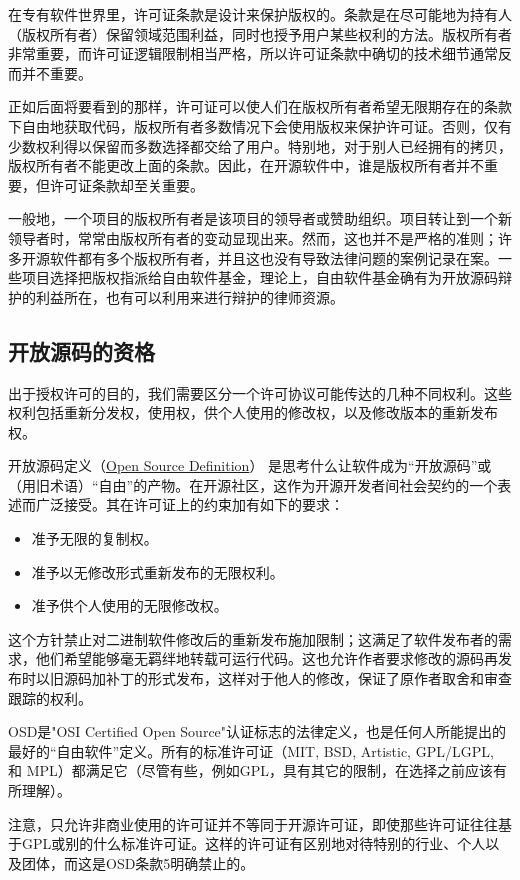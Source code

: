 \documentclass[12pt,oneside]{book}
\begin{document}
在专有软件世界里，许可证条款是设计来保护版权的。条款是在尽可能地为持有人（版权所有者）保留领域范围利益，同时也授予用户某些权利的方法。版权所有者非常重要，而许可证逻辑限制相当严格，所以许可证条款中确切的技术细节通常反而并不重要。

正如后面将要看到的那样，许可证可以使人们在版权所有者希望无限期存在的条款下自由地获取代码，版权所有者多数情况下会使用版权来保护许可证。否则，仅有少数权利得以保留而多数选择都交给了用户。特别地，对于别人已经拥有的拷贝，版权所有者不能更改上面的条款。因此，在开源软件中，谁是版权所有者并不重要，但许可证条款却至关重要。

一般地，一个项目的版权所有者是该项目的领导者或赞助组织。项目转让到一个新领导者时，常常由版权所有者的变动显现出来。然而，这也并不是严格的准则；许多开源软件都有多个版权所有者，并且这也没有导致法律问题的案例记录在案。一些项目选择把版权指派给自由软件基金，理论上，自由软件基金确有为开放源码辩护的利益所在，也有可以利用来进行辩护的律师资源。

\subsection{开放源码的资格}
出于授权许可的目的，我们需要区分一个许可协议可能传达的几种不同权利。这些权利包括重新分发权，使用权，供个人使用的修改权，以及修改版本的重新发布权。

开放源码定义（\href{http://www.opensource.org/osd.html}{Open Source Definition}） 是思考什么让软件成为“开放源码”或（用旧术语）“自由”的产物。在开源社区，这作为开源开发者间社会契约的一个表述而广泛接受。其在许可证上的约束加有如下的要求：
\begin{itemize}
\item 准予无限的复制权。
\item 准予以无修改形式重新发布的无限权利。
\item 准予供个人使用的无限修改权。
\end{itemize}

这个方针禁止对二进制软件修改后的重新发布施加限制；这满足了软件发布者的需求，他们希望能够毫无羁绊地转载可运行代码。这也允许作者要求修改的源码再发布时以旧源码加补丁的形式发布，这样对于他人的修改，保证了原作者取舍和审查跟踪的权利。

OSD是"OSI Certified Open Source"认证标志的法律定义，也是任何人所能提出的最好的“自由软件”定义。所有的标准许可证（MIT, BSD, Artistic, GPL/LGPL, 和 MPL）都满足它（尽管有些，例如GPL，具有其它的限制，在选择之前应该有所理解）。

注意，只允许非商业使用的许可证并不等同于开源许可证，即使那些许可证往往基于GPL或别的什么标准许可证。这样的许可证有区别地对待特别的行业、个人以及团体，而这是OSD条款5明确禁止的。
\end{document}
